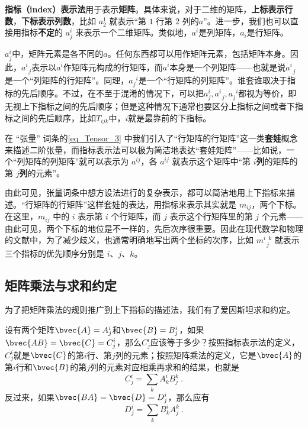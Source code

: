 \textbf{指标（index）表示法}用于表示\textbf{矩阵}。具体来说，对于二维的矩阵，\textbf{上标表示行数}，\textbf{下标表示列数}，比如 $a^1_2$ 就表示“第 $1$ 行第 $2$ 列的$a$”。进一步，我们也可以直接用指标\textbf{不定}的 $a^i_j$ 来表示一个二维矩阵。类似地，$a^i$是列矩阵，$a_i$是行矩阵。

$a^i_j$中，矩阵元素是各不同的$a$。任何东西都可以用作矩阵元素，包括矩阵本身。因此，$a^{i}_{\phantom{1}j}$表示以$a^i$作矩阵元构成的行矩阵，而$a^i$本身是一个列矩阵——也就是说$a^i_{\phantom{1}j}$是一个“列矩阵的行矩阵”。同理，$a^{\phantom{1}i}_j$是一个“行矩阵的列矩阵”。谁套谁取决于指标的先后顺序。不过，在不至于混淆的情况下，可以把$a^i_j, a^i_{\phantom{1}j}, a^{\phantom{1}i}_j$都视为等价，即无视上下指标之间的先后顺序；但是这种情况下通常也要区分上指标之间或者下指标之间的先后顺序，比如$T_{ijk}$中，$i$就是最靠前的下指标。

在 “张量” 词条的\autoref{eq_Tensor_3} 中我们引入了“行矩阵的行矩阵”这一类\textbf{套娃}概念来描述二阶张量，而指标表示法可以极为简洁地表达“套娃矩阵”——比如说，一个“列矩阵的列矩阵”就可以表示为 $a^{ij}$，各 $a^{ij}$ 就表示这个矩阵中“第 $i$\textbf{列}的矩阵的第 $j$\textbf{列}的元素”。

由此可见，张量词条中想方设法进行的复杂表示，都可以简洁地用上下指标来描述。“行矩阵的行矩阵”这样套娃的表达，用指标来表示其实就是 $m_{ij}$，两个下标。在这里，$m_{ij}$ 中的 $i$ 表示第 $i$ 个行矩阵，而 $j$ 表示这个行矩阵里的第 $j$ 个元素——由此可见，两个下标的地位是不一样的，先后次序很重要。因此在现代数学和物理的文献中，为了减少歧义，也通常明确地写出两个坐标的次序，比如 $m^{i\phantom{1}k}_{\phantom{1}j}$ 就表示三个指标的优先顺序分别是 $i$、$j$、$k$。




\subsection{矩阵乘法与求和约定}




为了把矩阵乘法的规则推广到上下指标的描述法，我们有了爱因斯坦求和约定。


设有两个矩阵$\bvec{A}=A^i_j$和$\bvec{B}=B^i_j$，如果$\bvec{AB}=\bvec{C}=C^i_j$，那么$C^i_j$应该等于多少？按照指标表示法的定义，$C^i_j$就是$\bvec{C}$的第$i$行、第$j$列的元素；按照矩阵乘法的定义，它是$\bvec{A}$的第$i$行和$\bvec{B}$的第$j$列的元素对应相乘再求和的结果，也就是
\begin{equation}
C^i_j = \sum_k A^i_k B^k_j~. 
\end{equation}
反过来，如果$\bvec{BA}=\bvec{D}=D^i_j$，那么应有
\begin{equation}
D^i_j = \sum_k B^i_k A^k_j~. 
\end{equation}


